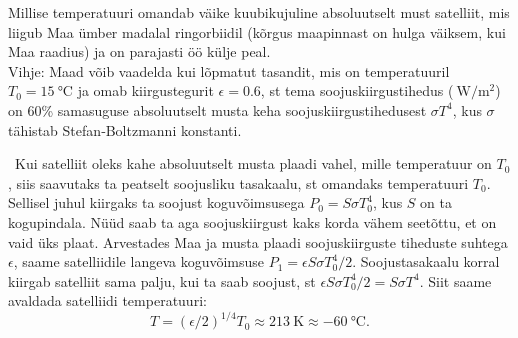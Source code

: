 
Millise temperatuuri omandab väike kuubikujuline absoluutselt must satelliit, mis liigub Maa ümber madalal ringorbiidil (kõrgus maapinnast on hulga väiksem, kui Maa raadius) ja on parajasti öö külje peal. \\
Vihje: Maad võib vaadelda kui lõpmatut tasandit, mis on temperatuuril $T_0=\SI{15}\celsius$ ja omab kiirgustegurit $\epsilon=\num{0.6}$, st tema soojuskiirgustihedus ($\SI{}{\watt / \metre\squared}$) on 60\% samasuguse absoluutselt musta keha soojuskiirgustihedusest $\sigma T^4$, kus $\sigma$ tähistab Stefan‐Boltzmanni konstanti.


\hint

\solu
\
Kui satelliit oleks kahe absoluutselt musta plaadi vahel, mille temperatuur on $T_0$, siis saavutaks ta peatselt soojusliku tasakaalu, st omandaks temperatuuri $T_0$. Sellisel juhul kiirgaks ta soojust koguvõimsusega $P_0=S \sigma T^4_0$, kus $S$ on ta kogupindala. Nüüd saab ta aga soojuskiirgust kaks korda vähem seetõttu, et on vaid üks plaat. Arvestades Maa ja musta plaadi soojuskiirguste tiheduste suhtega $\epsilon$, saame satelliidile langeva koguvõimsuse $P_1=\epsilon S \sigma T^4_0/2$. Soojustasakaalu korral kiirgab satelliit sama palju, kui ta saab soojust, st $\epsilon S \sigma T^4_0/2=S \sigma T^4$. Siit saame avaldada satelliidi temperatuuri:
$$
T=(\epsilon/2)^{1/4}T_0 \approx \SI{213}{\kelvin} \approx \SI{-60}{\celsius}. 
$$
\probend